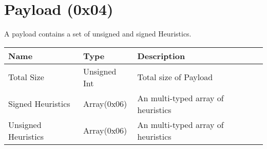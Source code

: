 \documentclass[11pt]{article}
\begin{document}
\section{Payload (0x04)}
A payload contains a set of unsigned and signed Heuristics.
\begin{center}
\begin{tabular}{ |l|l|l|l| } 
\hline
\textbf{Name} & \textbf{Type} & \textbf{Description}\\
\hline
Total Size & Unsigned Int & Total size of Payload \\ 
Signed Heuristics & Array(0x06) & An multi-typed array of heuristics\\  
Unsigned Heuristics & Array(0x06) & An multi-typed array of heuristics\\  

 
\hline
\end{tabular}
\end{center}
\end{document}

